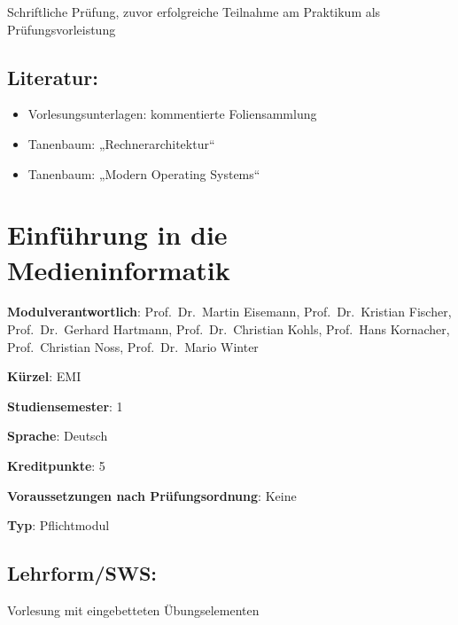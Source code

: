 Schriftliche Prüfung, zuvor erfolgreiche Teilnahme am Praktikum als
Prüfungsvorleistung

\section*{Literatur:}\label{literatur-6}

\begin{itemize}
\tightlist
\item
  Vorlesungsunterlagen: kommentierte Foliensammlung
\item
  Tanenbaum: „Rechnerarchitektur``
\item
  Tanenbaum: „Modern Operating Systems``
\end{itemize}

\chapter{Einführung in die
Medieninformatik}\label{einfuxfchrung-in-die-medieninformatik}

\begin{modulHead}
\textbf{Modulverantwortlich}: Prof.~Dr.~Martin
Eisemann, Prof.~Dr.~Kristian Fischer, Prof.~Dr.~Gerhard Hartmann,
Prof.~Dr.~Christian Kohls, Prof.~Hans Kornacher, Prof.~Christian Noss,
Prof.~Dr.~Mario
Winter
\end{modulHead}
\begin{modulHead}
\textbf{Kürzel}:
EMI
\end{modulHead}
\begin{modulHead}
\textbf{Studiensemester}:
1
\end{modulHead}
\begin{modulHead}
\textbf{Sprache}:
Deutsch
\end{modulHead}
\begin{modulHead}
\textbf{Kreditpunkte}:
5
\end{modulHead}
\begin{modulHead}
\textbf{Voraussetzungen nach
Prüfungsordnung}: Keine
\end{modulHead}
\begin{modulHead}
\textbf{Typ}:
Pflichtmodul
\end{modulHead}


\section*{Lehrform/SWS:}\label{lehrformsws-9}

Vorlesung mit eingebetteten Übungselementen


